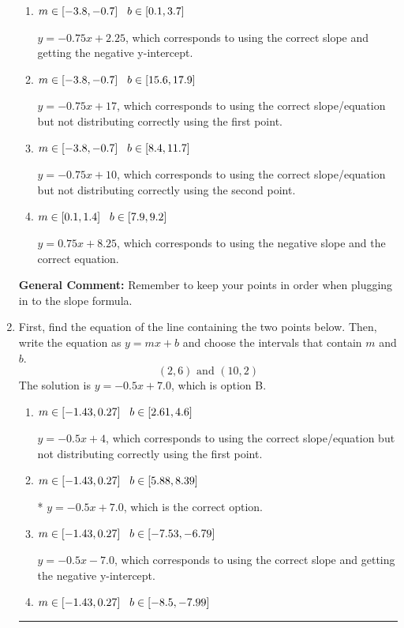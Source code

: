\documentclass{extbook}[14pt]
\newcommand{\litem}[1]{\item #1

\rule{\textwidth}{0.4pt}}
\begin{document}
\begin{enumerate}
{\begin{enumerate}[label=\Alph*.]
* $y = -0.75x -2.25$, which is the correct option.
\item \( m \in [-3.8, -0.7] \hspace*{3mm} b \in [0.1, 3.7] \)

 $y = -0.75x + 2.25$, which corresponds to using the correct slope and getting the negative y-intercept.
\item \( m \in [-3.8, -0.7] \hspace*{3mm} b \in [15.6, 17.9] \)

 $y = -0.75x + 17$, which corresponds to using the correct slope/equation but not distributing correctly using the first point.
\item \( m \in [-3.8, -0.7] \hspace*{3mm} b \in [8.4, 11.7] \)

 $y = -0.75x + 10$, which corresponds to using the correct slope/equation but not distributing correctly using the second point.
\item \( m \in [0.1, 1.4] \hspace*{3mm} b \in [7.9, 9.2] \)

 $y = 0.75x + 8.25$, which corresponds to using the negative slope and the correct equation.
\end{enumerate}

\textbf{General Comment:} Remember to keep your points in order when plugging in to the slope formula.
}
\litem{
First, find the equation of the line containing the two points below. Then, write the equation as $ y=mx+b $ and choose the intervals that contain $m$ and $b$.
\[ (2, 6) \text{ and } (10, 2) \]The solution is \( y = -0.5x + 7.0 \), which is option B.\begin{enumerate}[label=\Alph*.]
\item \( m \in [-1.43, 0.27] \hspace*{3mm} b \in [2.61, 4.6] \)

 $y = -0.5x + 4$, which corresponds to using the correct slope/equation but not distributing correctly using the first point.
\item \( m \in [-1.43, 0.27] \hspace*{3mm} b \in [5.88, 8.39] \)

* $y = -0.5x + 7.0$, which is the correct option.
\item \( m \in [-1.43, 0.27] \hspace*{3mm} b \in [-7.53, -6.79] \)

 $y = -0.5x -7.0$, which corresponds to using the correct slope and getting the negative y-intercept.
\item \( m \in [-1.43, 0.27] \hspace*{3mm} b \in [-8.5, -7.99] \)


\end{enumerate}}
\end{enumerate}
\end{document}
